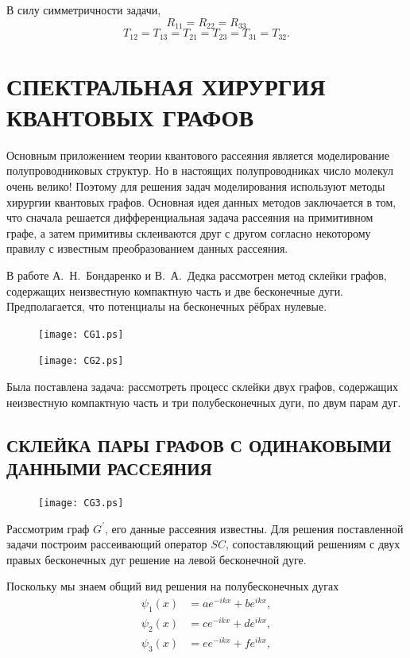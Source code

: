 \documentclass[a4 paper, 12 pt]{extarticle}
\begin{document}
   В силу симметричности задачи,
      \[R_{11} = R_{22} = R_{33}\]
   \[T_{12} = T_{13} = T_{21} = T_{23} = T_{31} = T_{32}.\]
   
   \section{СПЕКТРАЛЬНАЯ ХИРУРГИЯ КВАНТОВЫХ ГРАФОВ}
   Основным приложением теории квантового рассеяния является моделирование полупроводниковых структур. Но в настоящих полупроводниках число молекул очень велико! Поэтому для решения задач моделирования используют методы хирургии квантовых графов. Основная идея данных методов заключается в том, что сначала решается дифференциальная задача рассеяния на примитивном графе, а затем примитивы склеиваются друг с другом согласно некоторому правилу с известным преобразованием данных рассеяния.
   
   В работе А.~Н.~Бондаренко и В.~А.~Дедка \cite{SpectralSurgery} рассмотрен метод склейки графов, содержащих неизвестную компактную часть и две бесконечные дуги. Предполагается, что потенциалы на бесконечных рёбрах нулевые.
   \begin{figure}[!htb]
   	\centering
      	\texttt{[image: CG1.ps]}
   \end{figure}
   
      \begin{figure}[!htb]
      	\centering
      	\texttt{[image: CG2.ps]}
      \end{figure}

   Была поставлена задача: рассмотреть процесс склейки двух графов, содержащих неизвестную компактную часть и три полубесконечных дуги, по двум парам дуг.
   
   \subsection{СКЛЕЙКА ПАРЫ ГРАФОВ С ОДИНАКОВЫМИ ДАННЫМИ РАССЕЯНИЯ}
   \begin{figure}[!htb]
   	\centering
    \texttt{[image: CG3.ps]}
   \end{figure}

   Рассмотрим граф $G^\prime$, его данные рассеяния известны. Для решения поставленной задачи построим рассеивающий оператор $SC$, сопоставляющий решениям с двух правых бесконечных дуг решение на левой бесконечной дуге.
   
   Поскольку мы знаем общий вид решения на полубесконечных дугах
   \begin{equation}
   \begin{split}
   \label{GeneralSolution1}
   \psi_1\left(x\right) &= a e^{-ikx} + b e^{ikx}, \\
   \psi_2\left(x\right) &= c e^{-ikx} + d e^{ikx}, \\
   \psi_3\left(x\right) &= e e^{-ikx} + f e^{ikx},
   \end{split}
   \end{equation}
\end{document}
